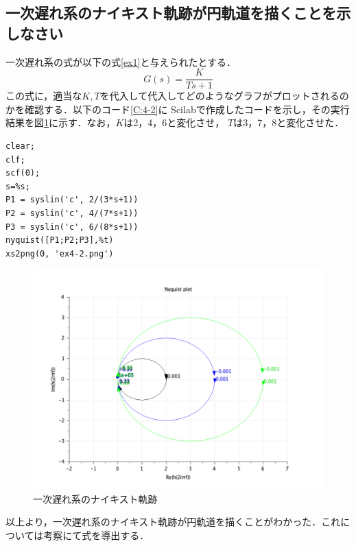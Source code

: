 \documentclass[a4paper,11pt]{jsarticle}
\begin{document}
\subsection{一次遅れ系のナイキスト軌跡が円軌道を描くことを示しなさい}
一次遅れ系の式が以下の式\ref{ex1}と与えられたとする．
\begin{equation}
  G(s) = \frac{K}{Ts+1} \label{ex1}
\end{equation}
この式に，適当な$K,T$を代入して代入してどのようなグラフがプロットされるのかを確認する．以下のコード\ref{C:4-2}に
Scilabで作成したコードを示し，その実行結果を図\ref{G:4-2}に示す．なお，$K$は2，4，6と変化させ，
$T$は3，7，8と変化させた．
\begin{lstlisting}[caption=一次遅れ系のナイキスト軌跡, label=C:4-2]
clear;
clf;
scf(0);
s=%s;
P1 = syslin('c', 2/(3*s+1))
P2 = syslin('c', 4/(7*s+1))
P3 = syslin('c', 6/(8*s+1))
nyquist([P1;P2;P3],%t)
xs2png(0, 'ex4-2.png')
  \end{lstlisting}
\begin{figure}[H]
  \centering
  \includegraphics[width=0.8\linewidth]{picture/ex4-2.png}
  \caption{一次遅れ系のナイキスト軌跡}
  \label{G:4-2}
\end{figure}
以上より，一次遅れ系のナイキスト軌跡が円軌道を描くことがわかった．これについては考察にて式を導出する．
\end{document}
